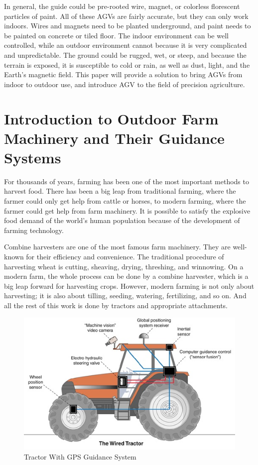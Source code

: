 In general, the guide could be pre-rooted wire, magnet, or colorless florescent particles of paint. All of these AGVs are fairly accurate, but they can only work indoors. Wires and magnets need to be planted underground, and paint needs to be painted on concrete or tiled floor. The indoor environment can be well controlled, while an outdoor environment cannot because it is very complicated and unpredictable. The ground could be rugged, wet, or steep, and because the terrain is exposed, it is susceptible to cold or rain, as well as dust, light, and the Earth's magnetic field. This paper will provide a solution to bring AGVs from indoor to outdoor use, and introduce AGV to the field of precision agriculture.

\section{Introduction to Outdoor Farm Machinery and Their Guidance Systems}

For thousands of years, farming has been one of the most important methods to harvest food. There has been a big leap from traditional farming, where the farmer could only get help from cattle or horses, to modern farming, where the farmer could get help from farm machinery. It is possible to satisfy the explosive food demand of the world's human population because of the development of farming technology.

Combine harvesters are one of the most famous farm machinery. They are well-known for their efficiency and convenience. The traditional procedure of harvesting wheat is cutting, sheaving, drying, threshing, and winnowing. On a modern farm, the whole process can be done by a combine harvester, which is a big leap forward for harvesting crops. However, modern farming is not only about harvesting; it is also about tilling, seeding, watering, fertilizing, and so on. And all the rest of this work is done by tractors and appropriate attachments.
\begin{figure}[ht!]
\begin{center}
\includegraphics[scale = 1]{pics/GPStractor.jpg}
\caption{Tractor With GPS Guidance System}
\end{center}
\end{figure}

